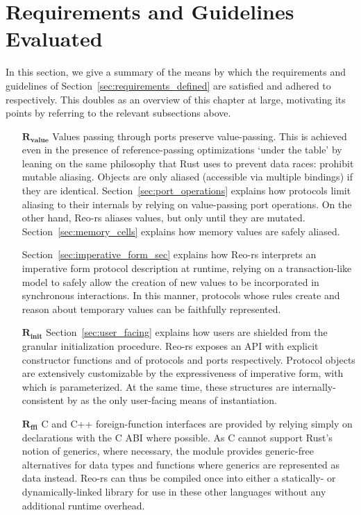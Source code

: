 \section{Requirements and Guidelines Evaluated}
\label{sec:requirements_evaluated}
In this section, we give a summary of the means by which the requirements and guidelines of Section~\ref{sec:requirements_defined} are satisfied and adhered to respectively. This doubles as an overview of this chapter at large, motivating its points by referring to the relevant subsections above.


\begin{enumerate}
	\item[$\boldsymbol{R_{value}}$] Values passing through ports preserve value-passing. This is achieved even in the presence of reference-passing optimizations `under the table' by leaning on the same philosophy that Rust uses to prevent data races: prohibit mutable aliasing. Objects are only aliased (accessible via multiple bindings) if they are identical. Section~\ref{sec:port_operations} explains how protocols limit aliasing to their internals by relying on value-passing port operations. On the other hand, Reo-rs aliases values, but only until they are mutated. Section~\ref{sec:memory_cells} explains how memory values are safely aliased.
	
	Section~\ref{sec:imperative_form_sec} explains how Reo-rs interprets an imperative form protocol description at runtime, relying on a transaction-like model to safely allow the creation of new values to be incorporated in synchronous interactions. In this manner, protocols whose rules create and reason about temporary values can be faithfully represented.
	
	\item[$\boldsymbol{R_{init}}$] Section~\ref{sec:user_facing} explains how users are shielded from the granular initialization procedure. Reo-rs exposes an API with explicit constructor functions  and  of protocols and ports respectively. Protocol objects are extensively customizable by the expressiveness of imperative form, with which  is parameterized. At the same time, these structures are internally-consistent by  as the only user-facing means of instantiation.
	
	\item[$\boldsymbol{R_{ffi}}$] C and C++ foreign-function interfaces are provided by relying simply on declarations with the C ABI where possible. As C cannot support Rust's notion of generics, where necessary, the  module provides generic-free alternatives for data types and functions where generics are represented as data instead. Reo-rs can thus be compiled once into either a statically- or dynamically-linked library for use in these other languages without any additional runtime overhead.
	

\end{enumerate}
